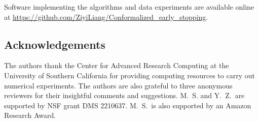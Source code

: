 Software implementing the algorithms and data experiments are available online at \url{https://github.com/ZiyiLiang/Conformalized_early_stopping}.


\subsection*{Acknowledgements}
The authors thank the Center for Advanced Research Computing at the University of Southern California for providing computing resources to carry out numerical experiments.
The authors are also grateful to three anonymous reviewers for their insightful comments and suggestions.
M.~S. and Y.~Z.~are supported by NSF grant DMS 2210637.
M.~S.~is also supported by an Amazon Research Award. 

